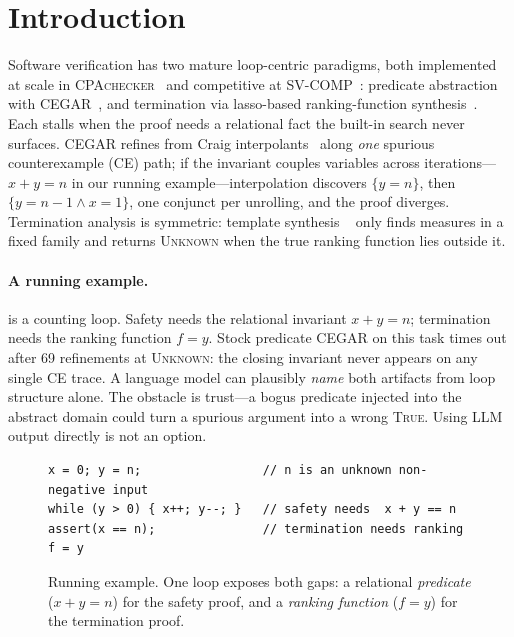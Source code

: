 \documentclass[runningheads]{llncs}
\newcommand{\cpa}{\textsc{CPAchecker}}
\begin{document}
\section{Introduction}
\label{sec:intro}

Software verification has two mature loop-centric paradigms, both implemented at scale in
\cpa{}~\cite{cpachecker2011} and competitive at SV-COMP~\cite{svcomp2022}: predicate
abstraction with CEGAR~\cite{cegar2003,predabstraction1997,slam2002}, and termination via
lasso-based ranking-function synthesis~\cite{ranking2004,ultimate2014}. Each stalls when
the proof needs a relational fact the built-in search never surfaces. CEGAR refines from
Craig interpolants~\cite{interpolation2003} along \emph{one} spurious counterexample (CE)
path; if the invariant couples variables across iterations---$x+y=n$ in our running
example---interpolation discovers $\{y=n\}$, then $\{y=n-1\wedge x=1\}$, one conjunct per
unrolling, and the proof diverges. Termination analysis is symmetric: template synthesis
~\cite{ultimate2014} only finds measures in a fixed family and returns \textsc{Unknown} when
the true ranking function lies outside it.

\paragraph{A running example.}
 is a counting loop. Safety needs the relational invariant $x+y=n$;
termination needs the ranking function $f=y$. Stock predicate CEGAR on this task times out
after 69 refinements at \textsc{Unknown}: the closing invariant never appears on any single CE
trace. A language model can plausibly \emph{name} both artifacts from loop structure alone.
The obstacle is trust---a bogus predicate injected into the abstract domain could turn a
spurious argument into a wrong \textsc{True}. Using LLM output directly is not an option.

\begin{figure}[t]
\begin{lstlisting}
x = 0; y = n;                 // n is an unknown non-negative input
while (y > 0) { x++; y--; }   // safety needs  x + y == n
assert(x == n);               // termination needs ranking f = y
\end{lstlisting}
\vspace{-6pt}
\caption{Running example. One loop exposes both gaps: a relational \emph{predicate}
($x{+}y{=}n$) for the safety proof, and a \emph{ranking function} ($f{=}y$) for the
termination proof.}
\label{lst:example}
\end{figure}
\end{document}

